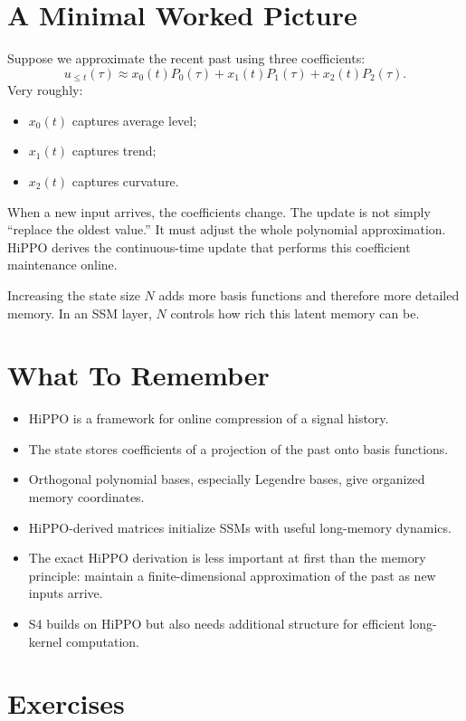 \section{A Minimal Worked Picture}

Suppose we approximate the recent past using three coefficients:
\[
  u_{\leq t}(\tau)
  \approx
  x_0(t)P_0(\tau)
  +
  x_1(t)P_1(\tau)
  +
  x_2(t)P_2(\tau).
\]
Very roughly:

\begin{itemize}
  \item $x_0(t)$ captures average level;
  \item $x_1(t)$ captures trend;
  \item $x_2(t)$ captures curvature.
\end{itemize}

When a new input arrives, the coefficients change. The update is not simply
``replace the oldest value.'' It must adjust the whole polynomial approximation. HiPPO
derives the continuous-time update that performs this coefficient maintenance online.

Increasing the state size $N$ adds more basis functions and therefore more detailed
memory. In an SSM layer, $N$ controls how rich this latent memory can be.

\section{What To Remember}

\begin{itemize}
  \item HiPPO is a framework for online compression of a signal history.
  \item The state stores coefficients of a projection of the past onto basis functions.
  \item Orthogonal polynomial bases, especially Legendre bases, give organized memory
  coordinates.
  \item HiPPO-derived matrices initialize SSMs with useful long-memory dynamics.
  \item The exact HiPPO derivation is less important at first than the memory principle:
  maintain a finite-dimensional approximation of the past as new inputs arrive.
  \item S4 builds on HiPPO but also needs additional structure for efficient long-kernel
  computation.
\end{itemize}

\section{Exercises}

